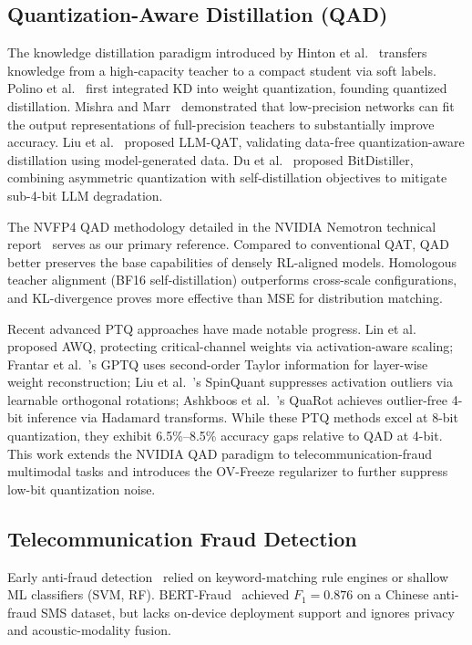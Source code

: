 \documentclass[final,5p,times,number]{elsarticle}
\begin{document}
\subsection{Quantization-Aware Distillation (QAD)}

The knowledge distillation paradigm introduced by Hinton et al.~\cite{4} transfers knowledge from a high-capacity teacher to a compact student via soft labels. Polino et al.~\cite{5} first integrated KD into weight quantization, founding quantized distillation. Mishra and Marr~\cite{6} demonstrated that low-precision networks can fit the output representations of full-precision teachers to substantially improve accuracy. Liu et al.~\cite{7} proposed LLM-QAT, validating data-free quantization-aware distillation using model-generated data. Du et al.~\cite{8} proposed BitDistiller, combining asymmetric quantization with self-distillation objectives to mitigate sub-4-bit LLM degradation.

The NVFP4 QAD methodology detailed in the NVIDIA Nemotron technical report~\cite{3} serves as our primary reference. Compared to conventional QAT, QAD better preserves the base capabilities of densely RL-aligned models. Homologous teacher alignment (BF16 self-distillation) outperforms cross-scale configurations, and KL-divergence proves more effective than MSE for distribution matching.

Recent advanced PTQ approaches have made notable progress. Lin et al.~\cite{9} proposed AWQ, protecting critical-channel weights via activation-aware scaling; Frantar et al.~\cite{10}'s GPTQ uses second-order Taylor information for layer-wise weight reconstruction; Liu et al.~\cite{11}'s SpinQuant suppresses activation outliers via learnable orthogonal rotations; Ashkboos et al.~\cite{12}'s QuaRot achieves outlier-free 4-bit inference via Hadamard transforms. While these PTQ methods excel at 8-bit quantization, they exhibit 6.5\%--8.5\% accuracy gaps relative to QAD at 4-bit. This work extends the NVIDIA QAD paradigm to telecommunication-fraud multimodal tasks and introduces the OV-Freeze regularizer to further suppress low-bit quantization noise.

\subsection{Telecommunication Fraud Detection}

Early anti-fraud detection~\cite{13,14,15} relied on keyword-matching rule engines or shallow ML classifiers (SVM, RF). BERT-Fraud~\cite{16} achieved $F_1 = 0.876$ on a Chinese anti-fraud SMS dataset, but lacks on-device deployment support and ignores privacy and acoustic-modality fusion.
\end{document}
